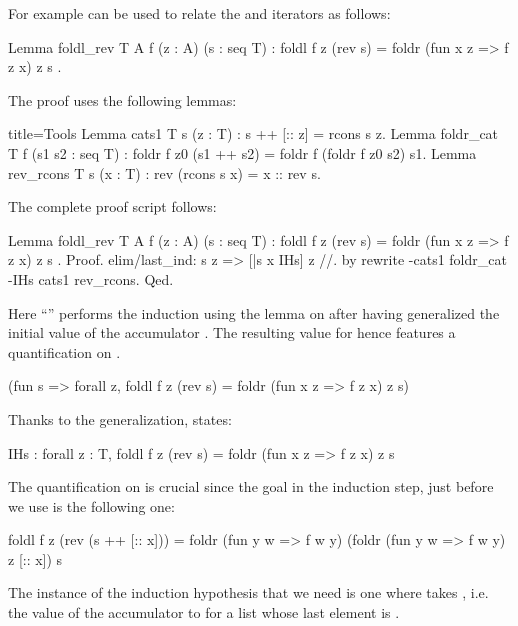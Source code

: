 For example  can be used to relate the
 and  iterators as follows:

\begin{coq}{}{}
Lemma foldl_rev T A f (z : A) (s : seq T) :
  foldl f z (rev s) = foldr (fun x z => f z x) z s .
\end{coq}

The proof uses the following lemmas:

\begin{coq}{}{title=Tools}
Lemma cats1 T s (z : T) : s ++ [:: z] = rcons s z.
Lemma foldr_cat T f (s1 s2 : seq T) :
  foldr f z0 (s1 ++ s2) = foldr f (foldr f z0 s2) s1.
Lemma rev_rcons T s (x : T) : rev (rcons s x) = x :: rev s.
\end{coq}

The complete proof script follows:

\begin{coq}{}{}
Lemma foldl_rev T A f (z : A) (s : seq T) :
  foldl f z (rev s) = foldr (fun x z => f z x) z s .
Proof.
elim/last_ind: s z => [|s x IHs] z //.
by rewrite -cats1 foldr_cat -IHs cats1 rev_rcons.
Qed.
\end{coq}

Here ``'' performs the induction using the
 lemma on  after having generalized the initial value of
the accumulator .  The resulting value for  hence
features a quantification on .

\begin{coq}{}{}
(fun s => forall z, foldl f z (rev s) = foldr (fun x z => f z x) z s)
\end{coq}

Thanks to the generalization,  states:

\begin{coq}{}{}
IHs : forall z : T, foldl f z (rev s) = foldr (fun x z => f z x) z s
\end{coq}
The quantification on  is crucial since the goal in the induction step,
just before we use  is the following one:

\begin{coqout}{}{}
foldl f z (rev (s ++ [:: x])) =
  foldr (fun y w => f w y) (foldr (fun y w => f w y) z [:: x]) s
\end{coqout}

The instance of the induction hypothesis that we need is
one where  takes ,
i.e. the value of the accumulator to  for a list
whose last element is .

